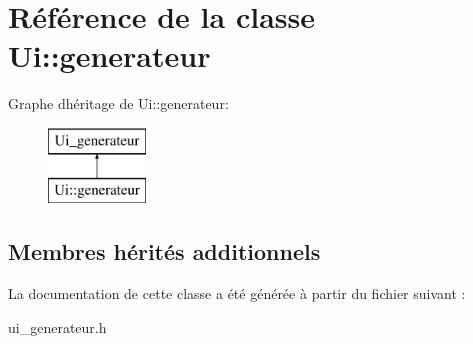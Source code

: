\hypertarget{class_ui_1_1generateur}{}\section{Référence de la classe Ui\+::generateur}
\label{class_ui_1_1generateur}
Graphe d\textquotesingle{}héritage de Ui\+::generateur\+:\begin{figure}[H]
\begin{center}
\leavevmode
\includegraphics[height=2.000000cm]{class_ui_1_1generateur}
\end{center}
\end{figure}
\subsection*{Membres hérités additionnels}


La documentation de cette classe a été générée à partir du fichier suivant \+:\begin{DoxyCompactItemize}
\item 
ui\+\_\+generateur.\+h\end{DoxyCompactItemize}
